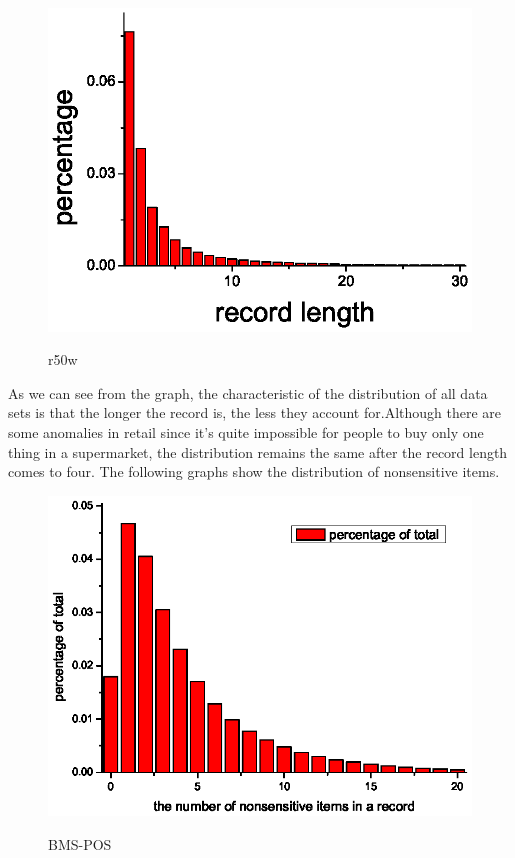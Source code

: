 \documentclass{article}
\begin{document}
\begin{figure}[htb]
   \centering
  \includegraphics[scale=.8]{r50w.eps}\\
  \caption{r50w}\label{fig:graph
  }
\end{figure}
As we can see from the graph, the characteristic of the distribution of all data sets is that the longer the record is, the less they account for.Although there are some anomalies in retail since it's quite impossible for people to buy only one thing in a supermarket, the distribution remains the same after the record length comes to four. The following graphs show the distribution of nonsensitive items.














\begin{figure}[htb]
  \centering
  \includegraphics[scale=.8
  ]{bmsnon.eps}\\
  \caption{BMS-POS}\label{fig:graph}
\end{figure}
\end{document}
